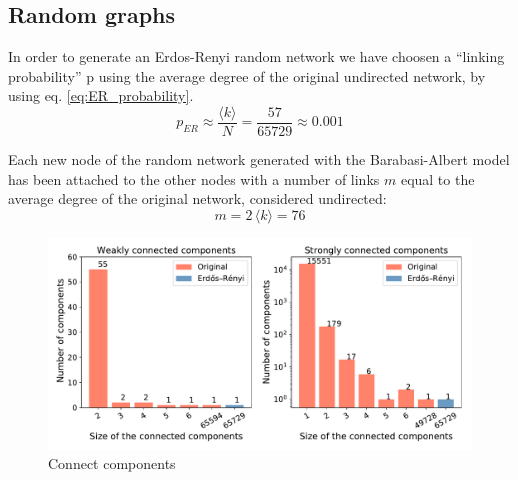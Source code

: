 \documentclass[12pt, twoside]{report}
\begin{document}
    \subsection{Random graphs} 
    In order to generate an Erdos-Renyi random network we have choosen a ``linking probability'' p using the average degree of the original undirected network, by using eq. \ref{eq:ER_probability}.
    \begin{equation}
      p_{ER} \approx \frac{\langle k  \rangle}{N} = \frac{57}{65729} \approx  0.001
      \label{eq:ER_probability}
    \end{equation}

    Each new node of the random network generated with the Barabasi-Albert model has been attached to the other nodes with a number of links $m$ equal to the average degree of the original network, considered undirected:
    \begin{equation}
      m = 2 \, \langle k \rangle = 76
      \label{eq:BA_model}
    \end{equation}

    
    \begin{figure}[htbp]
      \centering
      \includegraphics[width=\textwidth]{../../scripts/visualization/imgs/connectivity.pdf}            
      \caption{Connect components}
      \label{fig:connectivity}
    \end{figure}

    \clearpage
\end{document}
